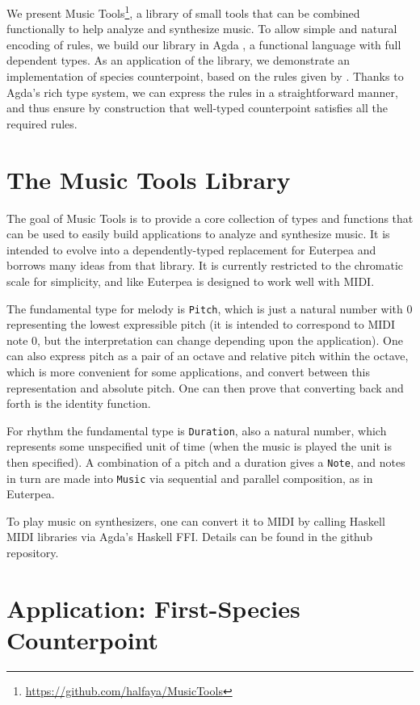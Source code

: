 \documentclass[sigplan,10pt,screen]{acmart}
\begin{document}
We present Music Tools\footnote{\url{https://github.com/halfaya/MusicTools}},
a library of small tools that can be combined functionally to 
help analyze and synthesize music.
To allow simple and natural encoding of rules, we build our 
library in Agda \citep{norellphd}, a functional language with full dependent types.
As an application of the library, we demonstrate an
implementation  of species counterpoint, based on the rules 
given by \citet{fux1965study}.
Thanks to Agda's rich type system, we can express 
the rules in a straightforward manner, and thus ensure by 
construction that well-typed counterpoint satisfies all the 
required rules.


\section{The Music Tools Library}

The goal of Music Tools is to provide a core collection of types and functions
that can be used to easily build applications to analyze and synthesize music.
It is intended to evolve into a dependently-typed replacement for Euterpea
\citep{hudak2018haskell} and borrows many ideas from that library.
It is currently restricted to the chromatic scale for simplicity, and like
Euterpea is designed to work well with MIDI.

The fundamental type for melody is \texttt{Pitch}, which is just a natural number with $0$
representing the lowest expressible pitch (it is intended to correspond to MIDI note 0, but
the interpretation can change depending upon the application). One can also
express pitch as a pair of an octave and relative pitch within the octave, which is
more convenient for some applications, and convert between this representation and
absolute pitch. One can then prove that converting back and forth is the identity function.

For rhythm the fundamental type is \texttt{Duration}, also a natural number, which represents
some unspecified unit of time (when the music is played the unit is then specified).
A combination of a pitch and a duration gives a \texttt{Note}, and notes in turn are
made into \texttt{Music} via sequential and parallel composition, as in Euterpea.

To play music on synthesizers, one can convert it to MIDI by calling 
Haskell MIDI libraries via Agda's Haskell FFI. 
Details can be found in the github repository.

\section{Application: First-Species Counterpoint}
\end{document}
